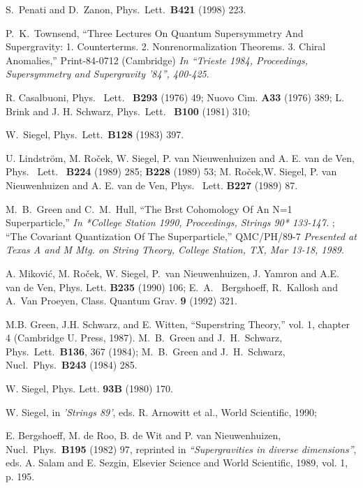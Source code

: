 \documentclass[a4paper,12pt]{article}
\begin{document}
\begin{thebibliography}{999}
  S.~Penati and D.~Zanon,
  Phys.\ Lett.\  {\bf B421} (1998) 223.



   P.~K.~Townsend, ``Three Lectures On Quantum Supersymmetry And
  Supergravity: 1. Counterterms. 2. Nonrenormalization Theorems. 3.
  Chiral Anomalies,'' Print-84-0712 (Cambridge) {\it In ``Trieste 1984,
    Proceedings, Supersymmetry and Supergravity '84'', 400-425}.
  
  
  R. Casalbuoni, Phys. \ Lett. \ {\bf B293}
  (1976) 49; Nuovo Cim. {\bf A33} (1976) 389;
  L. Brink and J. H. Schwarz, Phys.\ Lett.\ {\bf
    B100} (1981) 310;  

   W.~Siegel, 
   Phys.\ Lett.\ {\bf B128} (1983) 397.


  U. Lindstr\"om, M. Ro\v cek, W. Siegel, P. van Nieuwenhuizen and
  A. E. van de Ven, Phys. \ Lett. \ {\bf B224} (1989) 285; {\bf
    B228} (1989) 53; M. Ro\v cek,W. Siegel, P. van Nieuwenhuizen and
  A. E. van de Ven, Phys. \ Lett. {\bf B227} (1989) 87.  

  M.~B.~Green and C.~M.~Hull,
  ``The Brst Cohomology Of An N=1 Superparticle,''
  {\it  In *College Station 1990, Proceedings, Strings 90* 133-147. }; 
  ``The Covariant Quantization Of The Superparticle,'' QMC/PH/89-7 
  {\it Presented at Texas A and M Mtg. on String Theory, College
    Station, TX, Mar 13-18, 1989}. 

  A. Mikovi\'c, M. Ro\v{c}ek, W. Siegel, P.~van Nieuwenhuizen, 
  J. Yamron and A.E. van de Ven, Phys. Lett. {\bf B235} (1990)
  106; E.~A.~ Bergshoeff, R.~Kallosh and A.~Van
  Proeyen, Class. Quantum Grav. {\bf 9} (1992) 321.
 

  M.B. Green, J.H. Schwarz, and E. Witten, ``Superstring Theory,''  
  vol. 1, chapter 4 (Cambridge U. Press, 1987).  M.~B.~Green and
  J.~H.~Schwarz, 
Phys.\ Lett.\ {\bf B136}, 367 (1984); M.~B.~Green and J.~H.~Schwarz,
  Nucl.\ Phys.\ {\bf B243} (1984) 285.

  W. Siegel, Phys. Lett. {\bf 93B} (1980) 170.

 W. Siegel, in {\it 'Strings 89'}, eds. R. Arnowitt et
  al., World Scientific, 1990;

  E. Bergshoeff, M. de Roo, B. de Wit and P. van Nieuwenhuizen,
  Nucl.\ Phys.\ {\bf B195} (1982) 97, reprinted in {\it
    ``Supergravities in diverse dimensions''},  
  eds. A. Salam and E. Sezgin, Elsevier Science and World Scientific,
  1989, vol. 1, p. 195.


\end{thebibliography}
\end{document}

